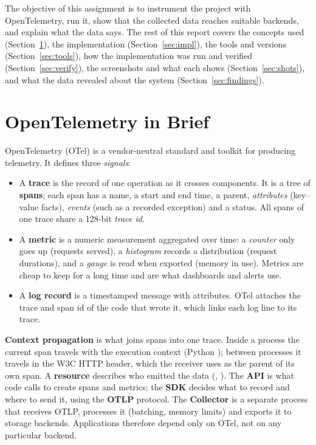 \documentclass[11pt,a4paper]{article}
\begin{document}
The objective of this assignment is to instrument the project with OpenTelemetry, run it, show
that the collected data reaches suitable backends, and explain what the data says. The rest of
this report covers the concepts used (Section~\ref{sec:concepts}), the implementation
(Section~\ref{sec:impl}), the tools and versions (Section~\ref{sec:tools}), how the
implementation was run and verified (Section~\ref{sec:verify}), the screenshots and what each
shows (Section~\ref{sec:shots}), and what the data revealed about the system
(Section~\ref{sec:findings}).

\section{OpenTelemetry in Brief}
\label{sec:concepts}
OpenTelemetry (OTel) is a vendor-neutral standard and toolkit for producing telemetry. It defines
three \emph{signals}:
\begin{itemize}
  \item A \textbf{trace} is the record of one operation as it crosses components. It is a tree
    of \textbf{spans}; each span has a name, a start and end time, a parent, \emph{attributes}
    (key--value facts), \emph{events} (such as a recorded exception) and a status. All spans of
    one trace share a 128-bit \emph{trace id}.
  \item A \textbf{metric} is a numeric measurement aggregated over time: a \emph{counter} only
    goes up (requests served), a \emph{histogram} records a distribution (request durations), and
    a \emph{gauge} is read when exported (memory in use). Metrics are cheap to keep for a long
    time and are what dashboards and alerts use.
  \item A \textbf{log record} is a timestamped message with attributes. OTel attaches the trace
    and span id of the code that wrote it, which links each log line to its trace.
\end{itemize}
\textbf{Context propagation} is what joins spans into one trace. Inside a process the current
span travels with the execution context (Python ); between processes it travels
in the W3C  HTTP header, which the receiver uses as the parent of its own span.
A \textbf{resource} describes who emitted the data (,
). The \textbf{API} is what code calls to create spans and metrics; the
\textbf{SDK} decides what to record and where to send it, using the \textbf{OTLP} protocol. The
\textbf{Collector} is a separate process that receives OTLP, processes it (batching, memory
limits) and exports it to storage backends. Applications therefore depend only on OTel, not on
any particular backend.
\end{document}
